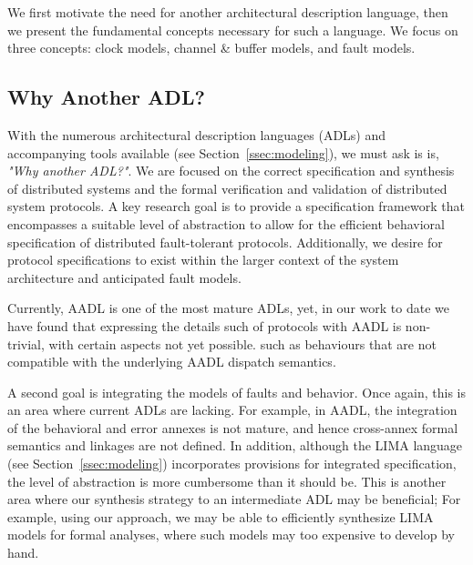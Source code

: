 We first motivate the need for another architectural description language, then we present the fundamental concepts necessary for such a language. We focus on three concepts: clock models, channel \& buffer models, and fault models.

\subsection{Why Another ADL?}

With the numerous architectural description languages (ADLs) and accompanying
tools available (see Section~\ref{ssec:modeling}), we must ask is
is, \emph{"Why another ADL?"}.
We are focused on the correct specification and synthesis of distributed systems
and the formal verification and validation of distributed system protocols.  A
key research goal is to provide a specification framework that encompasses a
suitable level of abstraction to allow for the efficient behavioral
specification of distributed fault-tolerant protocols.  Additionally, we desire
for protocol specifications to exist within the larger context of the system
architecture and anticipated fault models.

Currently, AADL is one of the most mature ADLs, yet, in our work to date we have
found that expressing the details such of protocols with AADL is non-trivial,
with certain aspects not yet possible. such as behaviours that are not
compatible with the underlying AADL dispatch semantics.


A second goal is integrating the models of faults and behavior.  Once again,
this is an area where current ADLs are lacking. For example, in
AADL, the integration of the behavioral and error annexes is not mature, and
hence cross-annex formal semantics and linkages are not defined.  In addition,
although the LIMA language (see Section~\ref{ssec:modeling}) incorporates provisions
for integrated specification, the level of abstraction is more
cumbersome than it should be.  This is another area where our
synthesis strategy to an intermediate ADL may be beneficial; For example, using
our approach, we may be able to efficiently synthesize LIMA models for formal
analyses, where such models may too expensive to develop by hand.

